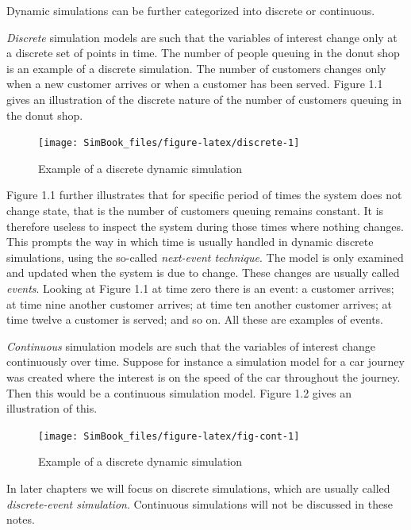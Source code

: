 \documentclass[
]{book}
\begin{document}
Dynamic simulations can be further categorized into discrete or continuous.

\emph{Discrete} simulation models are such that the variables of interest change only at a discrete set of points in time. The number of people queuing in the donut shop is an example of a discrete simulation. The number of customers changes only when a new customer arrives or when a customer has been served. Figure 1.1 gives an illustration of the discrete nature of the number of customers queuing in the donut shop.

\begin{figure}

{\centering \texttt{[image: SimBook\_files/figure-latex/discrete-1]} 

}

\caption{Example of a discrete dynamic simulation}\label{fig:discrete}
\end{figure}

Figure 1.1 further illustrates that for specific period of times the system does not change state, that is the number of customers queuing remains constant. It is therefore useless to inspect the system during those times where nothing changes. This prompts the way in which time is usually handled in dynamic discrete simulations, using the so-called \emph{next-event technique}. The model is only examined and updated when the system is due to change. These changes are usually called \emph{events}. Looking at Figure 1.1 at time zero there is an event: a customer arrives; at time nine another customer arrives; at time ten another customer arrives; at time twelve a customer is served; and so on. All these are examples of events.

\emph{Continuous} simulation models are such that the variables of interest change continuously over time. Suppose for instance a simulation model for a car journey was created where the interest is on the speed of the car throughout the journey. Then this would be a continuous simulation model. Figure 1.2 gives an illustration of this.

\begin{figure}

{\centering \texttt{[image: SimBook\_files/figure-latex/fig-cont-1]} 

}

\caption{Example of a discrete dynamic simulation}\label{fig:fig-cont}
\end{figure}

In later chapters we will focus on discrete simulations, which are usually called \emph{discrete-event simulation}. Continuous simulations will not be discussed in these notes.
\end{document}
